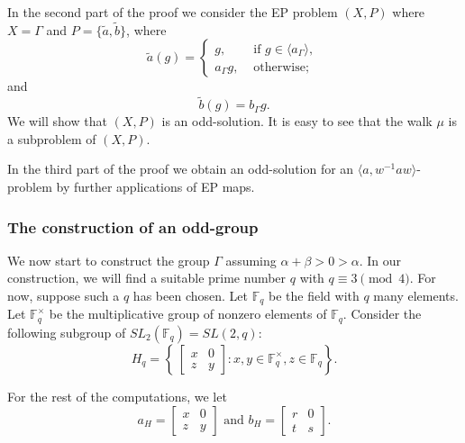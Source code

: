 \documentclass[10pt,a4paper]{amsart}
\theoremstyle{definition}
\theoremstyle{definition}
\numberwithin{equation}{section}
\begin{document}
In the second part of the proof we consider the EP problem $(X, P)$ where $X=\Gamma$ and $P=\{\tilde{a}, \tilde{b}\}$, where
$$ \tilde{a}(g)=\left\{\begin{array}{ll} g, & \mbox{ if $g\in \langle a_\Gamma\rangle$, }\\
a_\Gamma g, & \mbox{ otherwise;}
\end{array}\right. $$
and 
$$ \tilde{b}(g)=b_\Gamma g. $$
We will show that $(X, P)$ is an odd-solution. It is easy to see that the walk $\mu$ is a subproblem of $(X,P)$. 

In the third part of the proof we obtain an odd-solution for an $\langle a, w^{-1}aw\rangle$-problem by further applications of EP maps. 








\subsubsection{The construction of an odd-group}

We now start to construct the group $\Gamma$ assuming $\alpha+\beta>0>\alpha$. In our construction, we will find a suitable prime number $q$ with $q\equiv 3 \pmod 4$. For now, suppose such a $q$ has been chosen. 
Let $\mathbb{F}_q$ be the field with $q$ many elements. Let $\mathbb{F}_q^\times$ be the multiplicative group of nonzero elements of $\mathbb{F}_q$. Consider the following subgroup of $SL_2(\mathbb{F}_q)=SL(2,q)$:
$$ H_q=\left\{\ \left[\begin{array}{cc} x & 0 \\ z & y\end{array}\right] \colon x,y\in \mathbb{F}_q^\times, z\in \mathbb{F}_q\right\}. $$

For the rest of the computations, we let
\begin{equation}\label{eqn:abH} a_H=\left[\begin{array}{cc} x& 0 \\ z & y\end{array}\right] \mbox{ and } b_H=\left[\begin{array}{cc} r & 0 \\ t & s\end{array}\right]. \end{equation}
\end{document}
